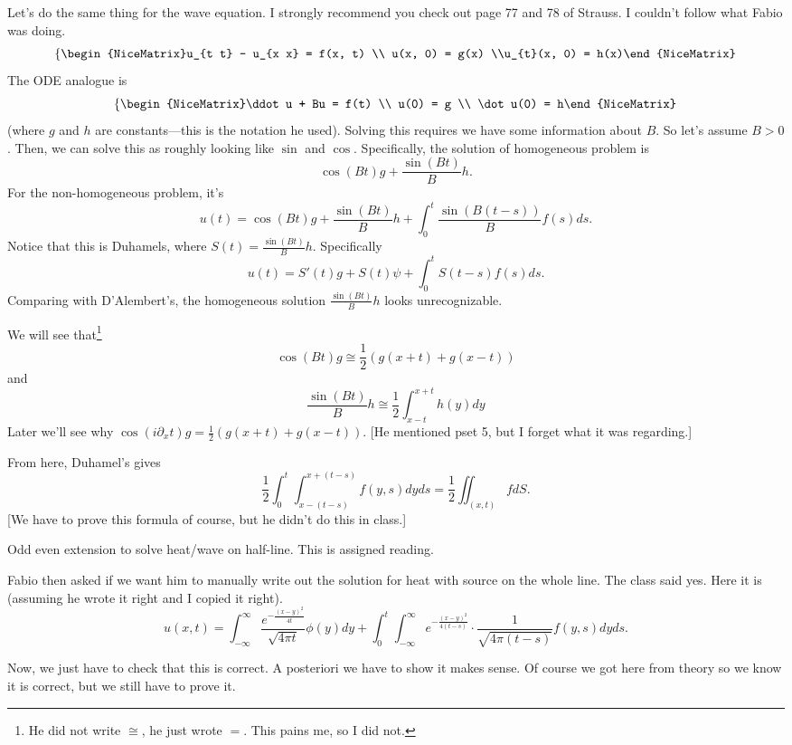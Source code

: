 Let's do the same thing for the wave equation. I strongly recommend you check out page 77 and 78 of Strauss. I couldn't follow what Fabio was doing.
\[ \left\{\begin{NiceMatrix}u_{t t} - u_{x x} = f(x, t) \\ u(x, 0) = g(x) \\u_{t}(x, 0) = h(x)\end{NiceMatrix}\right.  \]
The ODE analogue is
\[ \left\{\begin{NiceMatrix}\ddot u + Bu = f(t) \\ u(0) = g \\ \dot u(0) = h\end{NiceMatrix}\right.  \]
(where \( g \) and \( h \) are constants---this is the notation he used).
Solving this requires we have some information about \( B \). So let's assume \( B > 0 \). Then, we can solve this as roughly looking like \( \sin \) and \( \cos \). Specifically, the solution of homogeneous problem is
\[ \cos(Bt) g + \frac{\sin(Bt)}{B}h. \]
For the non-homogeneous problem, it's
\[ u(t) = \cos(Bt) g + \frac{\sin(Bt)}{B}h + \int_{0}^{t} \frac{\sin(B(t-s))}{B}f(s) ds. \]
Notice that this is Duhamels, where \( S(t) = \frac{\sin(Bt)}{B}h \). Specifically 
\[ u(t) = S'(t) g + S(t) \psi + \int_{0}^{t} S(t-s) f(s) ds. \]
Comparing with D'Alembert's, the homogeneous solution \( \frac{\sin(Bt)}{B} h \) looks unrecognizable.

We will see that\footnote{He did not write \( \cong \), he just wrote \( = \). This pains me, so I did not.}
\[ \cos(Bt)g \cong \frac{1}{2} (g(x + t) + g(x - t)) \]
and 
\[ \frac{\sin(Bt)}{B}h \cong \frac{1}{2} \int_{x-t}^{x+t} h(y) dy \]
Later we'll see why \( \cos(i \partial_{x}t) g = \frac{1}{2} (g(x + t) + g(x - t)). \)
[He mentioned pset 5, but I forget what it was regarding.]

From here, Duhamel's gives
\[ \frac{1}{2} \int_{0}^{t}  \int_{x - (t - s)}^{x + (t - s)} f(y, s) dy ds = \frac{1}{2} \iint_{(x, t)} f dS.  \]
[We have to prove this formula of course, but he didn't do this in class.]

Odd even extension to solve heat/wave on half-line. This is assigned reading.

Fabio then asked if we want him to manually write out the solution for heat with source on the whole line. The class said yes. Here it is (assuming he wrote it right and I copied it right).
\[
u(x, t) = \int_{- \infty}^{\infty} \frac{e^{- \frac{(x - y)^{2}}{4t}}}{\sqrt{4 \pi t}} \phi(y) dy + \int_{0}^{t} \int_{- \infty}^{\infty} e^{- \frac{(x-y)^{2}}{4(t-s)}} \cdot \frac{1}{\sqrt{4 \pi (t-s)}} f(y, s) dy ds.
\]

Now, we just have to check that this is correct. A posteriori we have to show it makes sense. Of course we got here from theory so we know it is correct, but we still have to prove it.
